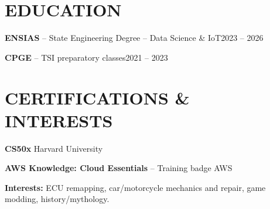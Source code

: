 \documentclass[11pt,a4paper]{article}
\newcommand{\entry}[2]{\noindent #1\hfill #2\par}
\begin{document}
\section*{EDUCATION}
\entry{\textbf{ENSIAS} -- State Engineering Degree -- Data Science \& IoT}{2023 -- 2026}
\vspace{3pt}
\entry{\textbf{CPGE} -- TSI preparatory classes}{2021 -- 2023}

\section*{CERTIFICATIONS \& INTERESTS}
\textbf{CS50x} \textbar{} Harvard University\par
\vspace{3pt}
\textbf{AWS Knowledge: Cloud Essentials} -- Training badge \textbar{} AWS\par

\vspace{5pt}
\textbf{Interests:} ECU remapping, car/motorcycle mechanics and repair, game modding, history/mythology.
\end{document}
